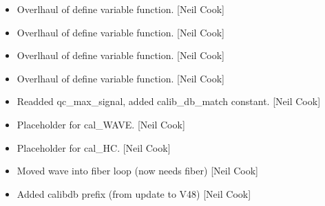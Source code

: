 \documentclass[a4paper,10pt,english]{report}
\begin{document}
\begin{itemize}
\item {} 
Overlhaul of define variable function. {[}Neil Cook{]}

\item {} 
Overlhaul of define variable function. {[}Neil Cook{]}

\item {} 
Overlhaul of define variable function. {[}Neil Cook{]}

\item {} 
Overlhaul of define variable function. {[}Neil Cook{]}

\item {} 
Readded qc\_max\_signal, added calib\_db\_match constant. {[}Neil Cook{]}

\item {} 
Placeholder for cal\_WAVE. {[}Neil Cook{]}

\item {} 
Placeholder for cal\_HC. {[}Neil Cook{]}

\item {} 
Moved wave into fiber loop (now needs fiber) {[}Neil Cook{]}

\item {} 
Added calibdb prefix (from update to V48) {[}Neil Cook{]}

\end{itemize}
\end{document}

